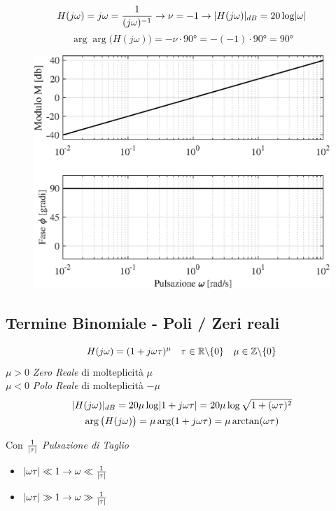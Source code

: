 \begin{nexample}
	\[ H(j\omega) =j\omega = \frac{1}{(j\omega)^{-1}} \rightarrow \nu = -1 \rightarrow \lvert H(j\omega)\rvert_{dB} = 20 \log \lvert\omega\rvert\]
	\[ \arg \arg \big(H(j\omega)\big) =-\nu \cdot \ang{90} =-(-1)\cdot \ang{90} =\ang{90}  \]
\begin{figure}[H]
	\centering
	\includegraphics[width=0.7\linewidth]{immagini/cap6_Bode/es2.eps}
	\label{fig:Bode_es2}
\end{figure}
\end{nexample}

\subsection{Termine Binomiale - Poli / Zeri reali}

\[ H(j\omega) = (1+j\omega\tau)^{\mu} \quad \tau \in \mathbb{R} \backslash \{0\} \quad \mu \in \mathbb{Z} \backslash \{0\}  \]
$ \mu>0 $ \emph{Zero Reale} di molteplicità $ \mu $\\
$ \mu<0 $ \emph{Polo Reale} di molteplicità $ -\mu $
\begin{gather*}
	\lvert H(j\omega)\rvert_{dB} = 20 \mu \log \lvert1+j\omega\tau\rvert = 20 \mu \log \sqrt{1+(\omega\tau)^2} \\
	\arg \big(H(j\omega)\big) = \mu \arg(1+j\omega\tau) = \mu \arctan(\omega\tau)
\end{gather*}

Con $ \frac{1}{\lvert\tau\rvert} $ \emph{Pulsazione di Taglio}
\begin{itemize}
	\item $ \lvert\omega\tau\rvert \ll 1 \rightarrow \omega \ll \frac{1}{\lvert\tau\rvert}$
	\item $ \lvert\omega\tau\rvert \gg 1 \rightarrow \omega \gg \frac{1}{\lvert\tau\rvert}$
\end{itemize}


